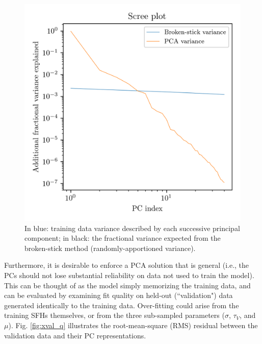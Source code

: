 \begin{figure}
    \centering
    \includegraphics[width=\columnwidth]{screeplot}
    \caption[Scree plot, and variance explained]{\fixspacing In blue: training data variance described by each successive principal component; in black: the fractional variance expected from the broken-stick method (randomly-apportioned variance).}
    \label{fig:screeplot}
\end{figure}

Furthermore, it is desirable to enforce a PCA solution that is general (i.e., the PCs should not lose substantial reliability on data not used to train the model). This can be thought of as the model simply memorizing the training data, and can be evaluated by examining fit quality on held-out (``validation") data generated identically to the training data. Over-fitting could arise from the training SFHs themselves, or from the three sub-sampled parameters ($\sigma$, $\tau_V$, and $\mu$). Fig. \ref{fig:xval_q} illustrates the root-mean-square (RMS) residual between the validation data and their PC representations.

